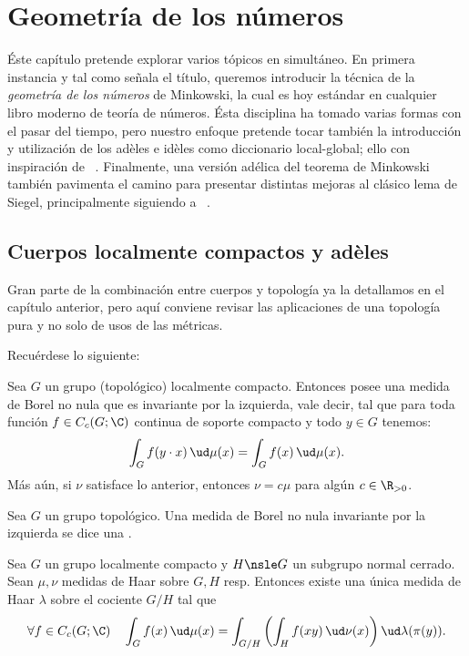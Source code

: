 \documentclass[teoria-numeros.tex]{subfiles}
\begin{document}
\chapter{Geometría de los números}
Éste capítulo pretende explorar varios tópicos en simultáneo.
En primera instancia y tal como señala el título, queremos introducir la técnica de la \textit{geometría de los números} de Minkowski,
la cual es hoy estándar en cualquier libro moderno de teoría de números.
Ésta disciplina ha tomado varias formas con el pasar del tiempo, pero nuestro enfoque pretende tocar también la introducción y utilización
de los adèles e idèles como diccionario local-global; ello con inspiración de \citeauthor{cassels67global}~\cite{cassels67global}.
Finalmente, una versión adélica del teorema de Minkowski también pavimenta el camino para presentar distintas mejoras al clásico lema de Siegel,
principalmente siguiendo a \citeauthor{bombieri:heights}~\cite{bombieri:heights}.

\section{Cuerpos localmente compactos y adèles}
Gran parte de la combinación entre cuerpos y topología ya la detallamos en el capítulo anterior,
pero aquí conviene revisar las aplicaciones de una topología pura y no solo de usos de las métricas.
\nocite{weil:basic}

Recuérdese lo siguiente:
\begin{thmi}\label{thm:exist_uniq_Haar}
	Sea $G$ un grupo (topológico) localmente compacto.
	Entonces posee una medida de Borel no nula que es invariante por la izquierda, vale decir,
	tal que para toda función $f \in C_c(G; \C)$ continua de soporte compacto
	y todo $y \in G$ tenemos:
	$$ \int_{G} f(y\cdot x) \, \ud\mu(x) = \int_{G} f(x) \, \ud \mu(x). $$
	Más aún, si $\nu$ satisface lo anterior, entonces $\nu = c\mu$ para algún $c \in \R_{>0}$.
\end{thmi}
\begin{mydef}
	Sea $G$ un grupo topológico.
	Una medida de Borel no nula invariante por la izquierda se dice una .
\end{mydef}

\begin{cor}
	Sea $G$ un grupo localmente compacto y $H \nsle G$ un subgrupo normal cerrado.
	Sean $\mu, \nu$ medidas de Haar sobre $G, H$ resp.
	Entonces existe una única medida de Haar $\lambda$ sobre el cociente $G/H$ tal que
	$$ \forall f\in C_c(G; \C) \quad \int_{G} f(x) \, \ud \mu(x) = \int_{G/H} \left( \int_{H} f(xy) \, \ud \nu(x) \right) \ud \lambda(\pi(y)). $$
\end{cor}
\end{document}
